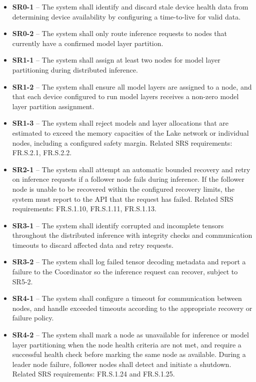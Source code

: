 \documentclass{article}
\begin{document}
\begin{itemize}
    \item \label{SR0-1}\textbf{SR0-1} -- The system shall identify and discard stale device health data from determining device availability by configuring a time-to-live for valid data. 
    \item \label{SR0-2}\textbf{SR0-2} -- The system shall only route inference requests to nodes that currently have a confirmed model layer partition.
    \item \label{SR1-1}\textbf{SR1-1} -- The system shall assign at least two nodes for model layer partitioning during distributed inference.
    \item \label{SR1-2}\textbf{SR1-2} -- The system shall ensure all model layers are assigned to a node, and that each device configured to run model layers receives a non-zero model layer partition assignment.
    \item \label{SR1-3}\textbf{SR1-3} -- The system shall reject models and layer allocations that are estimated to exceed the memory capacities of the Lake network or individual nodes, including a configured safety margin. Related SRS requirements: FR.S.2.1, FR.S.2.2.
    \item \label{SR2-1}\textbf{SR2-1} -- The system shall attempt an automatic bounded recovery and retry on inference requests if a follower node fails during inference. If the follower node is unable to be recovered within the configured recovery limits, the system must report to the API that the request has failed. Related SRS requirements: FR.S.1.10, FR.S.1.11, FR.S.1.13.
    \item \label{SR3-1}\textbf{SR3-1} -- The system shall identify corrupted and incomplete tensors throughout the distributed inference with integrity checks and communication timeouts to discard affected data and retry requests.
    \item \label{SR3-2}\textbf{SR3-2} -- The system shall log failed tensor decoding metadata and report a failure to the Coordinator so the inference request can recover, subject to SR5-2.
    \item \label{SR4-1}\textbf{SR4-1} -- The system shall configure a timeout for communication between nodes, and handle exceeded timeouts according to the appropriate recovery or failure policy.
    \item \label{SR4-2}\textbf{SR4-2} -- The system shall mark a node as unavailable for inference or model layer partitioning when the node health criteria are not met, and require a successful health check before marking the same node as available. During a leader node failure, follower nodes shall detect and initiate a shutdown. Related SRS requirements: FR.S.1.24 and FR.S.1.25.

\end{itemize}
\end{document}
